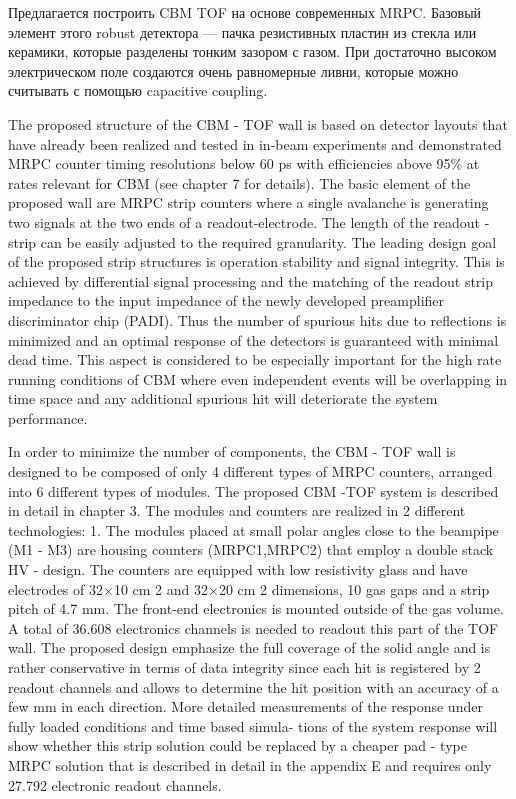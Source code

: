 Предлагается построить CBM TOF на основе современных MRPC. Базовый элемент этого robust детектора --- пачка резистивных пластин из стекла или керамики, которые разделены тонким зазором с газом. При достаточно высоком электрическом поле создаются очень равномерные ливни, которые можно считывать с помощью capacitive coupling.

The proposed structure of the CBM - TOF wall is based on detector layouts that have already been
realized and tested in in-beam experiments and demonstrated MRPC counter timing resolutions below
60 ps with efficiencies above 95\% at rates relevant for CBM (see chapter 7 for details). The basic element
of the proposed wall are MRPC strip counters where a single avalanche is generating two signals at
the two ends of a readout-electrode. The length of the readout - strip can be easily adjusted to the
required granularity. The leading design goal of the proposed strip structures is operation stability and
signal integrity. This is achieved by differential signal processing and the matching of the readout strip
impedance to the input impedance of the newly developed preamplifier discriminator chip (PADI). Thus
the number of spurious hits due to reflections is minimized and an optimal response of the detectors is
guaranteed with minimal dead time. This aspect is considered to be especially important for the high
rate running conditions of CBM where even independent events will be overlapping in time space and
any additional spurious hit will deteriorate the system performance.

In order to minimize the number of components, the CBM - TOF wall is designed to be composed of
only 4 different types of MRPC counters, arranged into 6 different types of modules. The proposed CBM
-TOF system is described in detail in chapter 3.
The modules and counters are realized in 2 different technologies:
1. The modules placed at small polar angles close to the beampipe (M1 - M3) are housing counters
(MRPC1,MRPC2) that employ a double stack HV - design. The counters are equipped with low
resistivity glass and have electrodes of 32$\times$10 cm 2 and 32$\times$20 cm 2 dimensions, 10 gas gaps and a
strip pitch of 4.7 mm. The front-end electronics is mounted outside of the gas volume. A total of
36.608 electronics channels is needed to readout this part of the TOF wall.
The proposed design emphasize the full coverage of the solid angle and is rather conservative in
terms of data integrity since each hit is registered by 2 readout channels and allows to determine
the hit position with an accuracy of a few mm in each direction.
More detailed measurements of the response under fully loaded conditions and time based simula-
tions of the system response will show whether this strip solution could be replaced by a cheaper
pad - type MRPC solution that is described in detail in the appendix E and requires only 27.792
electronic readout channels.


